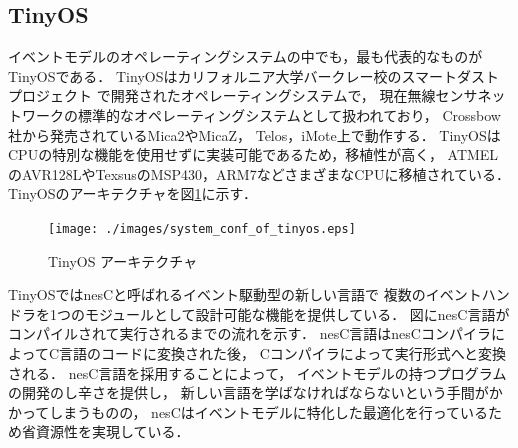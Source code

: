 \subsection{TinyOS}
イベントモデルのオペレーティングシステムの中でも，最も代表的なものが
TinyOS\cite{Hill:2000:SAD:356989.356998}\cite{Levis04tinyos:an}である．
TinyOSはカリフォルニア大学バークレー校のスマートダストプロジェクト
\cite{Kahn:1999:NCC:313451.313558}
で開発されたオペレーティングシステムで，
現在無線センサネットワークの標準的なオペレーティングシステムとして扱われており，
Crossbow社から発売されているMica2やMicaZ\cite{Hill:2002:MWP:623308.624560}，
Telos\cite{Polastre:2005:TEU:1147685.1147744}，iMote\cite{Nachman:2005:IMP:1147685.1147760}上で動作する．
TinyOSはCPUの特別な機能を使用せずに実装可能であるため，移植性が高く，
ATMELのAVR128LやTexsusのMSP430，ARM7などさまざまなCPUに移植されている．
TinyOSのアーキテクチャを図\ref{fig:system_conf_of_tinyos}に示す．

\begin{figure}[htbp]
 \begin{center}
  \texttt{[image: ./images/system\_conf\_of\_tinyos.eps]}
 \end{center}
 \caption{TinyOS アーキテクチャ\cite{tinyos_arch}}
 \label{fig:system_conf_of_tinyos}
\end{figure}

TinyOSではnesC\cite{Gay:2003:NLH:781131.781133}と呼ばれるイベント駆動型の新しい言語で
複数のイベントハンドラを1つのモジュールとして設計可能な機能を提供している．
図にnesC言語がコンパイルされて実行されるまでの流れを示す．
nesC言語はnesCコンパイラによってC言語のコードに変換された後，
Cコンパイラによって実行形式へと変換される．
nesC言語を採用することによって，
イベントモデルの持つプログラムの開発のし辛さを提供し，
新しい言語を学ばなければならないという手間がかかってしまうものの，
nesCはイベントモデルに特化した最適化を行っているため省資源性を実現している．



